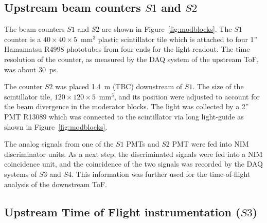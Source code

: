     
	\subsection{Upstream beam counters $S1$ and $S2$}
	
	The beam counters $S1$ and $S2$ are shown in Figure~\ref{fig:modblocks}. The $S1$ counter is a $40\times40\times5$~mm$^3$ plastic scintillator tile which is attached to four 1'' Hamamatsu R4998 phototubes from four ends for the light readout. The time resolution of the counter, as measured by the DAQ system of the upstream ToF, was about 30~ps. 
	
	The counter $S2$ was placed 1.4~m (TBC) downstream of $S1$. The size of the scintillator tile, $120\times120\times5$~mm$^3$, and its position were adjusted to account for the beam divergence in the moderator blocks. The light was collected by a 2'' PMT R13089 which was connected to the scintillator via long light-guide as shown in Figure~\ref{fig:modblocks}. 
	
	The analog signals from one of the $S1$ PMTs and $S2$ PMT were fed into NIM discriminator units.
	As a next step, the discriminated signals were fed into a NIM coincidence unit, and the coincidence of the two signals was recorded by the DAQ systems of $S3$ and $S4$. This information was further used for the time-of-flight analysis of the downstream ToF. 

    
\subsection{Upstream Time of Flight instrumentation ($S3$)}

